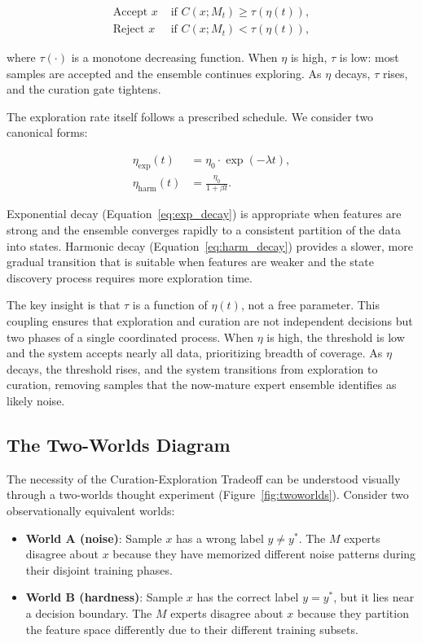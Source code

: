 \documentclass{article}
\begin{document}
\begin{align}
\text{Accept } x &\text{ if } C(x; M_t) \geq \tau(\eta(t)), \label{eq:accept} \\
\text{Reject } x &\text{ if } C(x; M_t) < \tau(\eta(t)), \label{eq:reject}
\end{align}

where $\tau(\cdot)$ is a monotone decreasing function. When $\eta$ is high, $\tau$ is low: most samples are accepted and the ensemble continues exploring. As $\eta$ decays, $\tau$ rises, and the curation gate tightens.

The exploration rate itself follows a prescribed schedule. We consider two canonical forms:

\begin{align}
\eta_{\text{exp}}(t) &= \eta_0 \cdot \exp(-\lambda t), \label{eq:exp_decay} \\
\eta_{\text{harm}}(t) &= \frac{\eta_0}{1 + \beta t}. \label{eq:harm_decay}
\end{align}

Exponential decay (Equation~\ref{eq:exp_decay}) is appropriate when features are strong and the ensemble converges rapidly to a consistent partition of the data into states. Harmonic decay (Equation~\ref{eq:harm_decay}) provides a slower, more gradual transition that is suitable when features are weaker and the state discovery process requires more exploration time.

The key insight is that $\tau$ is a function of $\eta(t)$, not a free parameter. This coupling ensures that exploration and curation are not independent decisions but two phases of a single coordinated process. When $\eta$ is high, the threshold is low and the system accepts nearly all data, prioritizing breadth of coverage. As $\eta$ decays, the threshold rises, and the system transitions from exploration to curation, removing samples that the now-mature expert ensemble identifies as likely noise.

\subsection{The Two-Worlds Diagram}
\label{sec:twoworlds}

The necessity of the Curation-Exploration Tradeoff can be understood visually through a two-worlds thought experiment (Figure~\ref{fig:twoworlds}). Consider two observationally equivalent worlds:

\begin{itemize}
    \item \textbf{World A (noise)}: Sample $x$ has a wrong label $y \neq y^*$. The $M$ experts disagree about $x$ because they have memorized different noise patterns during their disjoint training phases.
    \item \textbf{World B (hardness)}: Sample $x$ has the correct label $y = y^*$, but it lies near a decision boundary. The $M$ experts disagree about $x$ because they partition the feature space differently due to their different training subsets.
\end{itemize}
\end{document}

